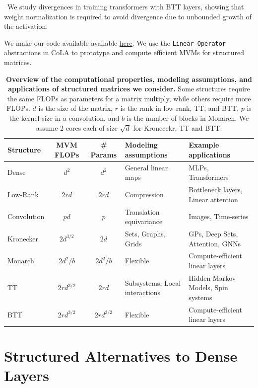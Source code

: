 \documentclass{article}
\theoremstyle{plain}
\theoremstyle{definition}
\theoremstyle{remark}
\begin{document}
\: \textbullet \, We study divergences in training transformers with BTT layers, showing that weight normalization is required to avoid divergence due to unbounded growth of the activation.

We make our code available available \href{https://github.com/shikaiqiu/compute-better-spent}{\underline{here}}. We use the \texttt{Linear Operator} abstractions in
CoLA \citep{potapczynski2024cola} to prototype and compute efficient MVMs for structured matrices.

%



\begin{table}[!t]
\centering
\begin{tabularx}{\textwidth}{l|c|c|l|X}
\toprule
\textbf{Structure} & \textbf{MVM FLOPs} & \textbf{\# Params} & \textbf{Modeling assumptions} & \textbf{Example applications} \\
\midrule
Dense & $d^{2}$ & $d^{2}$ & General linear maps & MLPs, Transformers \\
Low-Rank & $2rd$ & $2rd$ & Compression & Bottleneck layers, Linear attention \\
Convolution & $pd$ & $p$ & Translation equivariance & Images, Time-series \\
Kronecker & $2d^{3/2}$ & $2d$ & Sets, Graphs, Grids & GPs, Deep Sets, Attention, GNNs \\
Monarch & $2d^2/b$ & $2d^2/b$ & Flexible & Compute-efficient linear layers \\
TT & $2 r d^{3/2}$ & $2 r d$ & Subsystems, Local interactions & Hidden Markov Models, Spin systems \\
BTT & $2 r d^{3/2}$ & $2 r d^{3/2}$ & Flexible & Compute-efficient linear layers \\
\bottomrule
\end{tabularx}
\caption{\textbf{Overview of the computational properties, modeling assumptions, and applications of structured matrices we consider.} Some structures require the same FLOPs as parameters for a matrix multiply, while others require more FLOPs. $d$ is the size of the matrix, $r$ is the rank in low-rank, TT, and BTT, $p$ is the kernel size in a convolution, and $b$ is the number of blocks in Monarch. We assume 2 cores each of size $\sqrt{d}$ for Kronecekr, TT and BTT.}
\label{tab:structures_memory_compute}
\end{table}



\section{Structured Alternatives to Dense Layers} 
\label{sec:preliminaries}
\end{document}
